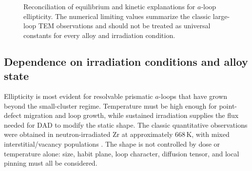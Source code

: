 \documentclass[11pt]{article}
\newcommand{\SI}[2]{\ensuremath{#1\,#2}}
\newcommand{\kelvin}{\mathrm{K}}
\begin{document}
\begin{figure}[htbp]
\centering
{}
\caption{Reconciliation of equilibrium and kinetic explanations for $a$-loop ellipticity. The numerical limiting values summarize the classic large-loop TEM observations and should not be treated as universal constants for every alloy and irradiation condition.}
\label{fig:ellipticity-model}
\end{figure}

\subsection{Dependence on irradiation conditions and alloy state}

Ellipticity is most evident for resolvable prismatic $a$-loops that have grown beyond the small-cluster regime. Temperature must be high enough for point-defect migration and loop growth, while sustained irradiation supplies the flux needed for DAD to modify the static shape. The classic quantitative observations were obtained in neutron-irradiated Zr at approximately \SI{668}{\kelvin}, with mixed interstitial/vacancy populations \citep{Jostsons1977Nature}. The shape is not controlled by dose or temperature alone: size, habit plane, loop character, diffusion tensor, and local pinning must all be considered.
\end{document}
